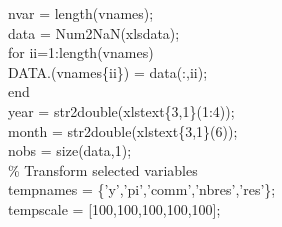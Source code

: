 \hspace{1mm}\hspace{5mm} \hspace{5mm} nvar = length(vnames); \\ 
\hspace{1mm}\hspace{5mm} \hspace{5mm} data   = Num2NaN(xlsdata); \\ 
\hspace{1mm}\hspace{5mm} \hspace{5mm} \textcolor{matlabblue}{for} ii=1:length(vnames) \\ 
\hspace{1mm}\hspace{5mm} \hspace{5mm} \hspace{5mm} DATA.(vnames\{ii\}) = data(:,ii); \\ 
\hspace{1mm}\hspace{5mm} \hspace{5mm} \textcolor{matlabblue}{end} \\ 
\hspace{1mm}\hspace{5mm} \hspace{5mm} year = str2double(xlstext\{3,1\}(1:4)); \\ 
\hspace{1mm}\hspace{5mm} \hspace{5mm} month = str2double(xlstext\{3,1\}(6)); \\ 
\hspace{1mm}\hspace{5mm} \hspace{5mm} nobs = size(data,1); \\ 
\hspace{1mm}\hspace{5mm} \hspace{5mm} \textcolor{matlabgreen}{\% Transform selected variables }\\ 
\hspace{1mm}\hspace{5mm} \hspace{5mm} tempnames = \{\textcolor{matlabpurple}{'y'},\textcolor{matlabpurple}{'pi'},\textcolor{matlabpurple}{'comm'},\textcolor{matlabpurple}{'nbres'},\textcolor{matlabpurple}{'res'}\}; \\ 
\hspace{1mm}\hspace{5mm} \hspace{5mm} tempscale = [100,100,100,100,100]; \\ 
